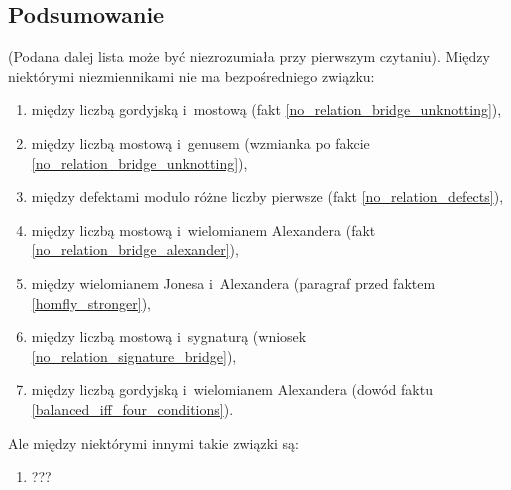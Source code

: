 

\subsection{Podsumowanie}
(Podana dalej lista może być niezrozumiała przy pierwszym czytaniu).
Między niektórymi niezmiennikami nie ma bezpośredniego związku:
\begin{enumerate}
    \item między liczbą gordyjską i~mostową (fakt \ref{no_relation_bridge_unknotting}),
    \item między liczbą mostową i~genusem (wzmianka po fakcie \ref{no_relation_bridge_unknotting}),
    \item między defektami modulo różne liczby pierwsze (fakt \ref{no_relation_defects}),
    \item między liczbą mostową i~wielomianem Alexandera (fakt \ref{no_relation_bridge_alexander}),
    \item między wielomianem Jonesa i~Alexandera (paragraf przed faktem \ref{homfly_stronger}),
    \item między liczbą mostową i~sygnaturą (wniosek \ref{no_relation_signature_bridge}),
    \item między liczbą gordyjską i~wielomianem Alexandera (dowód faktu \ref{balanced_iff_four_conditions}).
\end{enumerate}

Ale między niektórymi innymi takie związki są:
\begin{enumerate}
    \item ???
\end{enumerate}



